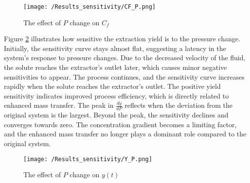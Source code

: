 \documentclass[../Article_Sensitivity_Analsysis.tex]{subfiles}
\begin{document}
	\begin{figure}[!ht]
		\centering
		\texttt{[image: /Results\_sensitivity/CF\_P.png]}
		\caption{The effect of $P$ change on $C_f$}
		\label{fig:Sensitivty_P_CF}
	\end{figure}
	
	Figure \ref{fig:Sensitivty_P_y} illustrates how sensitive the extraction yield is to the pressure change. Initially, the sensitivity curve stays almost flat, suggesting a latency in the system's response to pressure changes. Due to the decreased velocity of the fluid, the solute reaches the extractor's outlet later, which causes minor negative sensitivities to appear. The process continues, and the sensitivity curve increases rapidly when the solute reaches the extractor's outlet. The positive yield sensitivity indicates improved process efficiency, which is directly related to enhanced mass transfer. The peak in $\frac{dy}{dP}$ reflects when the deviation from the original system is the largest. Beyond the peak, the sensitivity declines and converges towards zero. The concentration gradient becomes a limiting factor, and the enhanced mass transfer no longer plays a dominant role compared to the original system.
	
	\begin{figure}[!ht]
		\centering
		\texttt{[image: /Results\_sensitivity/Y\_P.png]}
		\caption{The effect of $P$ change on $y(t)$}
		\label{fig:Sensitivty_P_y}
	\end{figure}
		
\end{document}
